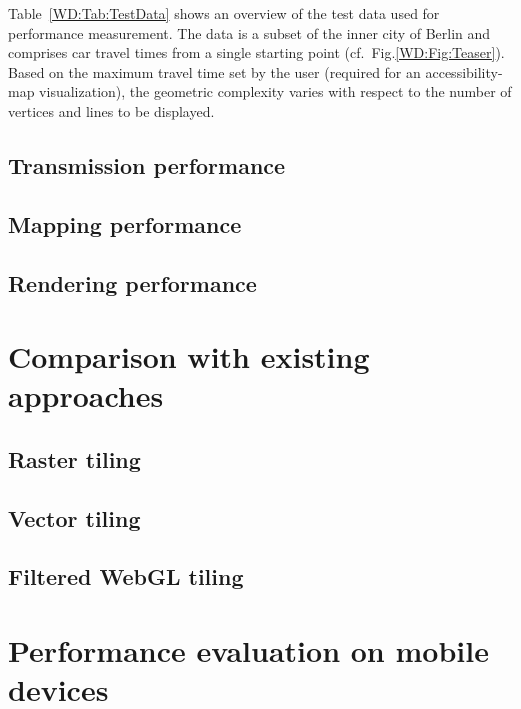       Table~\ref{WD:Tab:TestData} shows an overview of the test data used for performance
      measurement. The data is a subset of the inner city of Berlin and comprises car
      travel times from a single starting point (cf.~Fig.\ref{WD:Fig:Teaser}). Based on
      the maximum travel time set by the user (required for an accessibility-map visualization),
      the geometric complexity varies with respect to the number of vertices and lines
      to be displayed.\par
    \subsection{Transmission performance}
    \subsection{Mapping performance}
    \subsection{Rendering performance}
  \section{Comparison with existing approaches}
    \subsection{Raster tiling}
    \subsection{Vector tiling}
    \subsection{Filtered WebGL tiling}
  \section{Performance evaluation on mobile devices}
